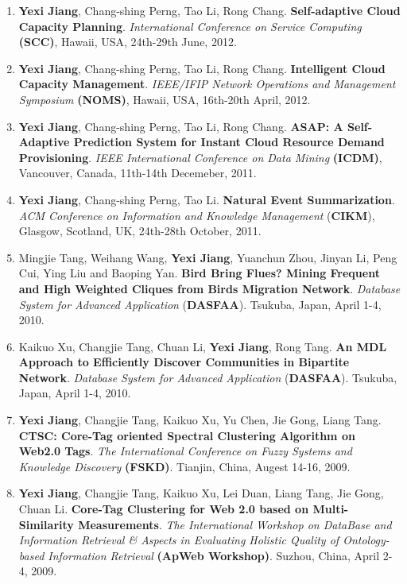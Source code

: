 \documentclass{res}
\begin{document}
\begin{resume}
    \begin{enumerate}
        \item \textbf{Yexi Jiang}, Chang-shing Perng, Tao Li, Rong Chang. \textbf{Self-adaptive Cloud Capacity Planning}. \emph{International Conference on Service Computing} \textbf{(SCC)}, Hawaii, USA, 24th-29th June, 2012.
        \item \textbf{Yexi Jiang}, Chang-shing Perng, Tao Li, Rong Chang. \textbf{Intelligent Cloud Capacity Management}. \emph{IEEE/IFIP Network Operations and Management Symposium} \textbf{(NOMS)}, Hawaii, USA, 16th-20th April, 2012.
        \item \textbf{Yexi Jiang}, Chang-shing Perng, Tao Li, Rong Chang. \textbf{ASAP: A Self-Adaptive Prediction System for Instant Cloud Resource Demand Provisioning}. \emph{IEEE International Conference on Data Mining} \textbf{(ICDM)}, Vancouver, Canada, 11th-14th Decemeber, 2011.
        \item \textbf{Yexi Jiang}, Chang-shing Perng, Tao Li. \textbf{Natural Event Summarization}. \emph{ACM Conference on Information and Knowledge Management }(\textbf{CIKM}), Glasgow, Scotland, UK, 24th-28th October, 2011.
        \item Mingjie Tang, Weihang Wang, \textbf{Yexi Jiang}, Yuanchun Zhou, Jinyan Li, Peng Cui, Ying Liu and Baoping Yan. \textbf{Bird Bring Flues? Mining Frequent and High Weighted Cliques from Birds Migration Network}. \textit{Database System for Advanced Application} (\textbf {DASFAA}). Tsukuba, Japan, April 1-4, 2010.
        \item Kaikuo Xu, Changjie Tang, Chuan Li, \textbf{Yexi Jiang}, Rong Tang. \textbf{An MDL Approach to Efficiently Discover Communities in Bipartite Network}. \textit{Database System for Advanced Application} (\textbf {DASFAA}). Tsukuba, Japan, April 1-4, 2010.
        \item \textbf{Yexi Jiang}, Changjie Tang, Kaikuo Xu, Yu Chen, Jie Gong, Liang Tang. \textbf{CTSC: Core-Tag oriented Spectral Clustering Algorithm on Web2.0 Tags}. \textit{The International Conference on Fuzzy Systems and Knowledge Discovery} \textbf{(FSKD)}. Tianjin, China, Augest 14-16, 2009.
        \item \textbf{Yexi Jiang}, Changjie Tang, Kaikuo Xu, Lei Duan, Liang Tang, Jie Gong, Chuan Li. \textbf{Core-Tag Clustering for Web 2.0 based on Multi-Similarity Measurements}. \textit{The International Workshop on DataBase and Information Retrieval \& Aspects in Evaluating Holistic Quality of Ontology-based Information Retrieval} \textbf{(ApWeb Workshop)}. Suzhou, China, April 2-4, 2009.

\end{enumerate}
\end{resume}
\end{document}
